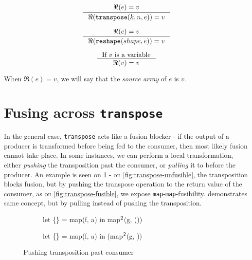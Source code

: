 \[
\inference{
  \Re(e) = v
}{
  \Re(\texttt{transpose}(k,n,e)) = v
}
\]

\[
\inference{
  \Re(e) = v
}{
  \Re(\texttt{reshape}(shape,e)) = v
}
\]

\[
\inference{
  \mbox{If $v$ is a variable}
}{
  \Re(v) = v
}
\]

When $\Re(e) = v$, we will say that the \textit{source array} of $e$
is $v$.

\section{Fusing across \texttt{transpose}}

In the general case, \texttt{transpose} acts like a fusion blocker -
if the output of a producer is transformed before being fed to the
consumer, then most likely fusion cannot take place.  In some
instances, we can perform a local transformation, either
\textit{pushing} the transposition past the consumer, or
\textit{pulling} it to before the producer.  An example is seen on
\cref{fig:fuse-across-transpose} - on \cref{fig:transpose-unfusible},
the transposition blocks fusion, but by pushing the transpose
operation to the return value of the consumer, as on
\cref{fig:transpose-fusible}, we expose
\texttt{map}-\texttt{map}-fusibility.  
demonstrates same concept, but by pulling instead of pushing the
transposition.

\begin{figure}
\begin{subfigure}[t]{.5\textwidth}
\begin{colorcode}
let \{\} = map(f, a) in
map\(^{2}\)(g, ())
\end{colorcode}
\end{subfigure}%
\begin{subfigure}[t]{.5\textwidth}
\begin{colorcode}
let \{\} = map(f, a) in
(map\(^{2}\)(g, ))
\end{colorcode}
\end{subfigure}

\caption{Pushing transposition past consumer}
\label{fig:fuse-across-transpose}
\end{figure}

